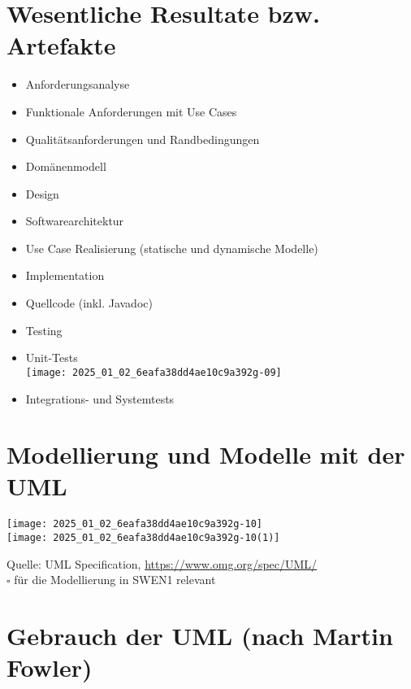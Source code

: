 \documentclass[10pt]{article}
\begin{document}
\section*{Wesentliche Resultate bzw. Artefakte}
\begin{itemize}
  \item Anforderungsanalyse
  \item Funktionale Anforderungen mit Use Cases
  \item Qualitätsanforderungen und Randbedingungen
  \item Domänenmodell
  \item Design
  \item Softwarearchitektur
  \item Use Case Realisierung (statische und dynamische Modelle)
  \item Implementation
  \item Quellcode (inkl. Javadoc)
  \item Testing
  \item Unit-Tests\\
\texttt{[image: 2025\_01\_02\_6eafa38dd4ae10c9a392g-09]}
  \item Integrations- und Systemtests
\end{itemize}

\section*{Modellierung und Modelle mit der UML}
\texttt{[image: 2025\_01\_02\_6eafa38dd4ae10c9a392g-10]}\\
\texttt{[image: 2025\_01\_02\_6eafa38dd4ae10c9a392g-10(1)]}

Quelle: UML Specification, \href{https://www.omg.org/spec/UML/}{https://www.omg.org/spec/UML/}\\
$\square$ für die Modellierung in SWEN1 relevant

\section*{Gebrauch der UML (nach Martin Fowler)}
\end{document}
